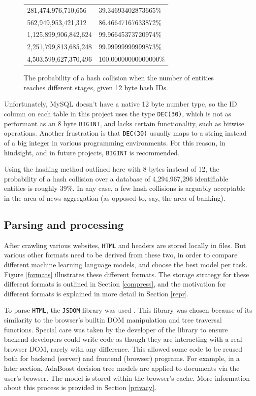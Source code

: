 \begin{figure}
\begin{tabular}{|l|l|}
    281,474,976,710,656     &  39.34693402873665\%\\
    562,949,953,421,312     &  86.46647167633872\%\\
    1,125,899,906,842,624   &  99.96645373720974\%\\
    2,251,799,813,685,248   &  99.99999999999873\%\\
    4,503,599,627,370,496   & 100.00000000000000\%\\
    \hline
    \end{tabular}
    \doublespacing
    \caption{The probability of a hash collision when the number of entities reaches different stages, given 12 byte hash IDs.}
    \label{bday}
\end{figure}

Unfortunately, MySQL doesn't have a native 12 byte number type, so the
ID column on each table in this project uses the type {\tt DEC(30)},
which is not as performant as an 8 byte {\tt BIGINT}, and lacks certain
functionality, such as bitwise operations.  Another frustration is that
{\tt DEC(30)} usually maps to a string instead of a big integer in
various programming environments.  For this reason, in hindsight, and
in future projects, {\tt BIGINT} is recommended.

Using the hashing method outlined here with 8 bytes instead of 12,
the probability of a hash collision over a database of 4,294,967,296
identifiable entities is roughly 39\%.  In any case, a few hash
collisions is arguably acceptable in the area of news aggregation
(as opposed to, say, the area of banking).

\subsection{Parsing and processing\label{parse}}

After crawling various websites, {\tt HTML} and headers are stored
locally in files.  But various other formats need to be derived from
these two, in order to compare different machine learning language
models, and choose the best model per task.  Figure \ref{formats}
illustrates these different formats.  The storage strategy for these
different formats is outlined in Section \ref{compress}, and the
motivation for different formats is explained in more detail
in Section \ref{repr}.

To parse {\tt HTML}, the {\tt JSDOM} library was used \cite{jsdom}.
This library was chosen because of its similarity to the
browser's builtin DOM manipulation and tree traversal functions.
Special care was taken by the developer of the library to ensure
backend developers could write code as though they are interacting
with a real browser DOM, rarely with any difference.
This allowed some code to be reused both
for backend (server) and frontend (browser) programs.  For example,
in a later section, AdaBoost decision tree models
are applied to documents via the user's browser.  The model is
stored within the browser's cache.  More information about this
process is provided in Section \ref{privacy}.

